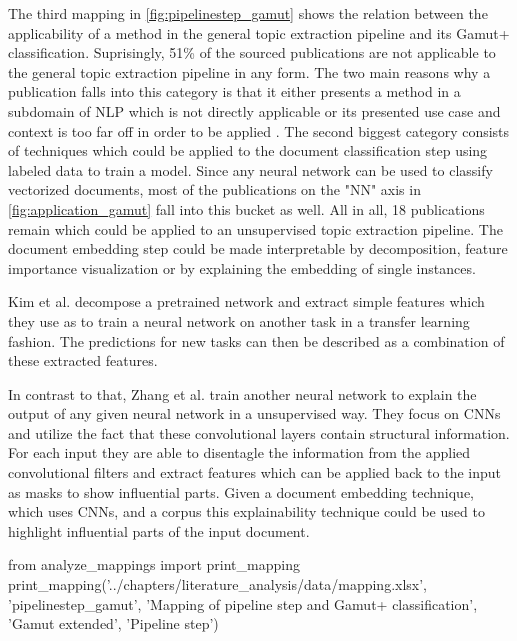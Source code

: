 The third mapping in \autoref{fig:pipelinestep_gamut} shows the relation between the applicability of a method in the general topic extraction pipeline and its Gamut+ classification. Suprisingly, 51\% of the sourced publications are not applicable to the general topic extraction pipeline in any form. The two main reasons why a publication falls into this category is that it either presents a method in a subdomain of NLP which is not directly applicable \cite{goyalTransparentAISystems2016} \cite{itoTextVisualizingNeuralNetwork2018a} or its presented use case and context is too far off in order to be applied \cite{8591457} \cite{gengHumancentricTransferLearning}.
The second biggest category consists of techniques which could be applied to the document classification step using labeled data to train a model. Since any neural network can be used to classify vectorized documents, most of the publications on the "NN" axis in \autoref{fig:application_gamut} fall into this bucket as well. All in all, 18 publications remain which could be applied to an unsupervised topic extraction pipeline. 
The document embedding step could be made interpretable by decomposition, feature importance visualization or by explaining the embedding of single instances. 

Kim et al. \cite{kimStructureDeepNeural2019} decompose a pretrained network and extract simple features which they use as to train a neural network on another task in a transfer learning fashion. The predictions for new tasks can then be described as a combination of these extracted features.

In contrast to that, Zhang et al. \cite{zhangUnsupervisedLearningNeural2018} train another neural network to explain the output of any given neural network in a unsupervised way. They focus on CNNs and utilize the fact that these convolutional layers contain structural information. For each input they are able to disentagle the information from the applied convolutional filters and extract features which can be applied back to the input as masks to show influential parts. Given a document embedding technique, which uses CNNs, and a corpus this explainability technique could be used to highlight influential parts of the input document.

\begin{pycode}
from analyze_mappings import print_mapping
print_mapping('../chapters/literature_analysis/data/mapping.xlsx', 'pipelinestep_gamut', 'Mapping of pipeline step and Gamut+ classification', 'Gamut extended', 'Pipeline step')
\end{pycode}

